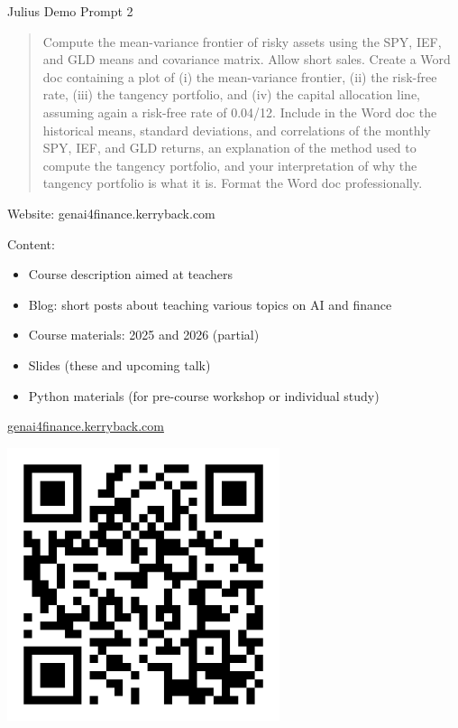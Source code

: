 \documentclass{beamer}
\begin{document}
\begin{frame}{Julius Demo Prompt 2}
   \begin{quote}
   Compute the mean-variance frontier of risky assets using the SPY, IEF, and GLD means and covariance matrix.  Allow short sales.  Create a Word doc containing a plot of (i) the mean-variance frontier, (ii) the risk-free rate, (iii) the tangency portfolio, and (iv) the capital allocation line, assuming again a risk-free rate of 0.04/12.  Include in the Word doc the historical means, standard deviations, and correlations of the monthly SPY, IEF, and GLD returns, an explanation of the method used to compute the tangency portfolio, and your interpretation of why the tangency portfolio is what it is.  Format the Word doc professionally.

   \end{quote}
\end{frame}


\begin{frame}{Website: genai4finance.kerryback.com}

Content:
\begin{itemize}
\item Course description aimed at teachers
\item Blog: short posts about teaching various topics on AI and finance 
\item Course materials: 2025 and 2026 (partial)
\item Slides (these and upcoming talk)
\item Python materials (for pre-course workshop or individual study)
\end{itemize}
\end{frame} 

\begin{frame}{\href{https://genai4finance.kerryback.com}{genai4finance.kerryback.com}}
\begin{center}
\includegraphics[width=0.6\textwidth]{genai4finance_qr.png}
\end{center}
\end{frame}
\end{document}
